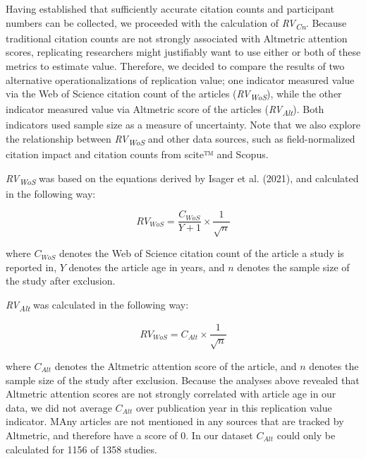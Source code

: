 \documentclass[
  man,floatsintext]{apa6}
\begin{document}
Having established that sufficiently accurate citation counts and participant numbers can be collected, we proceeded with the calculation of \emph{RV\textsubscript{Cn}}. Because traditional citation counts are not strongly associated with Altmetric attention scores, replicating researchers might justifiably want to use either or both of these metrics to estimate value. Therefore, we decided to compare the results of two alternative operationalizations of replication value; one indicator measured value via the Web of Science citation count of the articles (\emph{RV\textsubscript{WoS}}), while the other indicator measured value via Altmetric score of the articles (\emph{RV\textsubscript{Alt}}). Both indicators used sample size as a measure of uncertainty. Note that we also explore the relationship between \emph{RV\textsubscript{WoS}} and other data sources, such as field-normalized citation impact and citation counts from scite™ and Scopus.

\emph{RV\textsubscript{WoS}} was based on the equations derived by Isager et al. (2021), and calculated in the following way:

\begin{equation} 
  \tag{2}
  RV_{WoS} = \frac{C_{WoS}}{Y+1}\times\frac{1}{\sqrt{n}}
  \label{eq:2}
\end{equation}

where \(C_{WoS}\) denotes the Web of Science citation count of the article a study is reported in, \(Y\) denotes the article age in years, and \(n\) denotes the sample size of the study after exclusion.

\emph{RV\textsubscript{Alt}} was calculated in the following way:

\begin{equation} 
  \tag{3}
  RV_{WoS} = C_{Alt}\times\frac{1}{\sqrt{n}}
  \label{eq:3}
\end{equation}

where \(C_{Alt}\) denotes the Altmetric attention score of the article, and \(n\) denotes the sample size of the study after exclusion. Because the analyses above revealed that Altmetric attention scores are not strongly correlated with article age in our data, we did not average \(C_{Alt}\) over publication year in this replication value indicator. MAny articles are not mentioned in any sources that are tracked by Altmetric, and therefore have a score of 0. In our dataset \(C_{Alt}\) could only be calculated for 1156 of 1358 studies.
\end{document}
